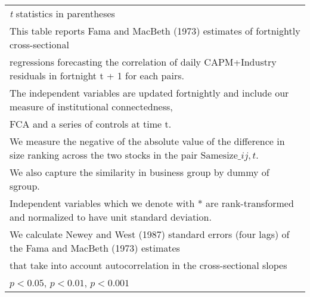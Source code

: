 {\begin{tabular}{l*{7}{c}}
\hline\hline
\multicolumn{8}{l}{\footnotesize \textit{t} statistics in parentheses}\\
\multicolumn{8}{l}{\footnotesize This table reports Fama and MacBeth (1973) estimates of fortnightly cross-sectional}\\
\multicolumn{8}{l}{\footnotesize  regressions forecasting the correlation of daily CAPM+Industry residuals in fortnight t + 1 for each pairs.}\\
\multicolumn{8}{l}{\footnotesize The independent variables are updated fortnightly and include our measure of institutional connectedness,}\\
\multicolumn{8}{l}{\footnotesize  FCA and a series of controls at time t.}\\
\multicolumn{8}{l}{\footnotesize We measure the negative of the absolute value of the difference in size ranking across the two stocks in the pair $ \text{Samesize}\_{ij,t} $.}\\
\multicolumn{8}{l}{\footnotesize We also capture the similarity in business group by dummy of sgroup.}\\
\multicolumn{8}{l}{\footnotesize Independent variables which  we denote with * are rank-transformed and normalized to have unit standard deviation.}\\
\multicolumn{8}{l}{\footnotesize  We calculate Newey and West (1987) standard errors (four lags) of the Fama and MacBeth (1973) estimates }\\
\multicolumn{8}{l}{\footnotesize  that take into account autocorrelation in the cross-sectional slopes}\\
\multicolumn{8}{l}{\footnotesize \sym{*} \(p<0.05\), \sym{**} \(p<0.01\), \sym{***} \(p<0.001\)}\\
\end{tabular}
}
